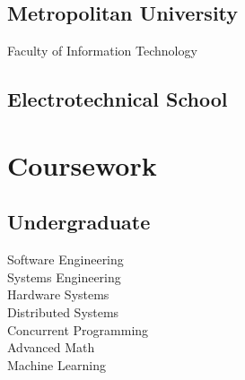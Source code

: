 \documentclass[]{matija-resume}
\begin{document}
\begin{minipage}[t]{0.33\textwidth}
\subsection{Metropolitan University}
Faculty of Information Technology \\
\sectionsep

\subsection{Electrotechnical School}
\sectionsep


\section{Coursework}
\subsection{Undergraduate}
Software Engineering \\
Systems Engineering \\
Hardware Systems \\
Distributed Systems \\
Concurrent Programming \\
Advanced Math \\
Machine Learning \\
\sectionsep

%
%

\end{minipage} 
\hfill
\end{document}
